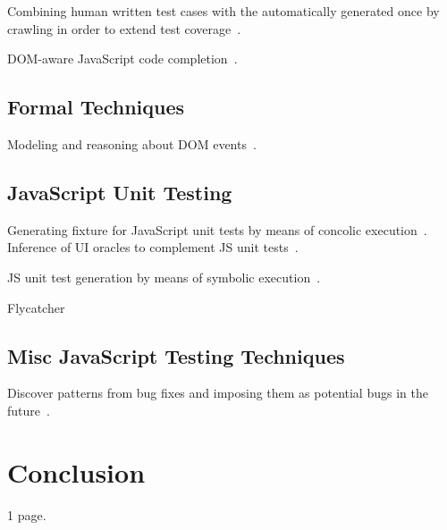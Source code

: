 \documentclass[sigconf]{acmart}
\begin{document}
Combining human written test cases with the automatically generated once by crawling in order to extend test coverage~\cite{milani2014leveraging}.

DOM-aware JavaScript code completion~\cite{bajaj2014dompletion}. 

\subsection{Formal Techniques}
\label{sub.sec.formal}

Modeling and reasoning about DOM events~\cite{lerner2012modeling}.

\subsection{JavaScript Unit Testing}
\label{sub.sec.js.unit.test}

Generating fixture for JavaScript unit tests by means of concolic execution~\cite{amin:ase15}. Inference of UI oracles to complement JS unit tests~\cite{icst16}.

JS unit test generation by means of symbolic execution~\cite{tanida2014automatic}.

Flycatcher~\cite{deautomatic}

\subsection{Misc JavaScript Testing Techniques}
\label{sub.sec.misc.test.tech}

Discover patterns from bug fixes and imposing them as potential bugs in the future~\cite{quinn:fse16}. 

\section{Conclusion}
\label{sec:concl}
1 page.


 
\end{document}
